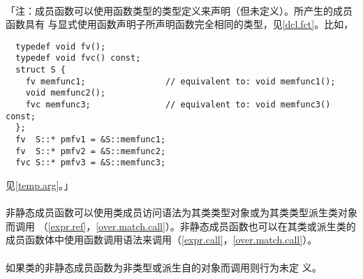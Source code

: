 \paragraph{}
「注：成员函数可以使用函数类型的类型定义来声明（但未定义）。所产生的成员函数具有
与显式使用函数声明子所声明函数完全相同的类型，见\ref{dcl.fct}。比如，
\begin{lstlisting}
  typedef void fv();
  typedef void fvc() const;
  struct S {
    fv memfunc1;                // equivalent to: void memfunc1();
    void memfunc2();
    fvc memfunc3;               // equivalent to: void memfunc3() const;
  };
  fv  S::* pmfv1 = &S::memfunc1;
  fv  S::* pmfv2 = &S::memfunc2;
  fvc S::* pmfv3 = &S::memfunc3;
\end{lstlisting}
见\ref{temp.arg}。」

\paragraph{}
非静态成员函数可以使用类成员访问语法为其类类型对象或为其类类型派生类对象而调用
（\ref{expr.ref}，\ref{over.match.call}）。非静态成员函数也可以在其类或派生类的
成员函数体中使用函数调用语法来调用（\ref{expr.call}，\ref{over.match.call}）。

\paragraph{}
如果类的非静态成员函数为非类型或派生自的对象而调用则行为未定
义。

